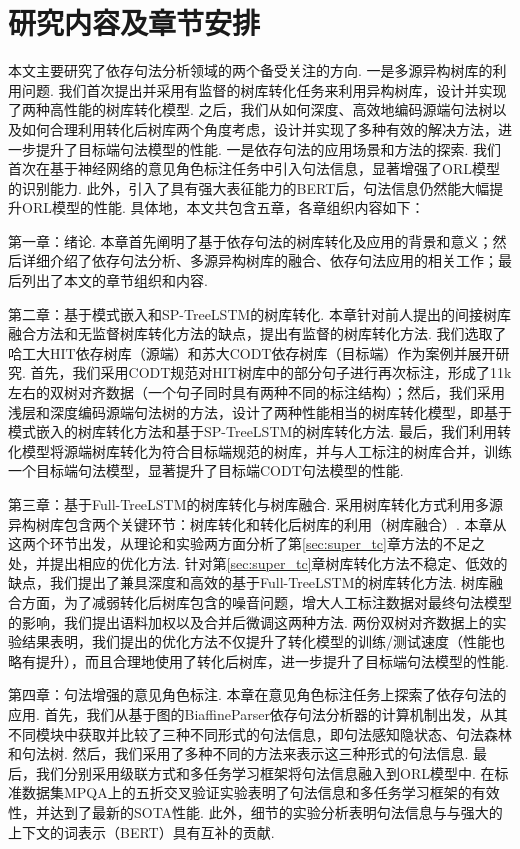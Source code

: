 \section{研究内容及章节安排}
本文主要研究了依存句法分析领域的两个备受关注的方向.
一是多源异构树库的利用问题. 我们首次提出并采用有监督的树库转化任务来利用异构树库，设计并实现了两种高性能的树库转化模型.
之后，我们从如何深度、高效地编码源端句法树以及如何合理利用转化后树库两个角度考虑，设计并实现了多种有效的解决方法，进一步提升了目标端句法模型的性能.
一是依存句法的应用场景和方法的探索.
我们首次在基于神经网络的意见角色标注任务中引入句法信息，显著增强了ORL模型的识别能力.
此外，引入了具有强大表征能力的BERT后，句法信息仍然能大幅提升ORL模型的性能.
具体地，本文共包含五章，各章组织内容如下：

第一章：绪论. 本章首先阐明了基于依存句法的树库转化及应用的背景和意义；然后详细介绍了依存句法分析、多源异构树库的融合、依存句法应用的相关工作；最后列出了本文的章节组织和内容.

第二章：基于模式嵌入和SP-TreeLSTM的树库转化.
本章针对前人提出的间接树库融合方法和无监督树库转化方法的缺点，提出有监督的树库转化方法. 我们选取了哈工大HIT依存树库（源端）和苏大CODT依存树库（目标端）作为案例并展开研究. 首先，我们采用CODT规范对HIT树库中的部分句子进行再次标注，形成了11k左右的双树对齐数据（一个句子同时具有两种不同的标注结构）；然后，我们采用浅层和深度编码源端句法树的方法，设计了两种性能相当的树库转化模型，即基于模式嵌入的树库转化方法和基于SP-TreeLSTM的树库转化方法. 最后，我们利用转化模型将源端树库转化为符合目标端规范的树库，并与人工标注的树库合并，训练一个目标端句法模型，显著提升了目标端CODT句法模型的性能.

第三章：基于Full-TreeLSTM的树库转化与树库融合.
采用树库转化方式利用多源异构树库包含两个关键环节：树库转化和转化后树库的利用（树库融合）. 本章从这两个环节出发，从理论和实验两方面分析了第\ref{sec:super_tc}章方法的不足之处，并提出相应的优化方法. 针对第\ref{sec:super_tc}章树库转化方法不稳定、低效的缺点，我们提出了兼具深度和高效的基于Full-TreeLSTM的树库转化方法. 树库融合方面，为了减弱转化后树库包含的噪音问题，增大人工标注数据对最终句法模型的影响，我们提出语料加权以及合并后微调这两种方法. 两份双树对齐数据上的实验结果表明，我们提出的优化方法不仅提升了转化模型的训练/测试速度（性能也略有提升），而且合理地使用了转化后树库，进一步提升了目标端句法模型的性能.

第四章：句法增强的意见角色标注.
本章在意见角色标注任务上探索了依存句法的应用. 首先，我们从基于图的BiaffineParser依存句法分析器的计算机制出发，从其不同模块中获取并比较了三种不同形式的句法信息，即句法感知隐状态、句法森林和句法树.
然后，我们采用了多种不同的方法来表示这三种形式的句法信息. 最后，我们分别采用级联方式和多任务学习框架将句法信息融入到ORL模型中. 在标准数据集MPQA上的五折交叉验证实验表明了句法信息和多任务学习框架的有效性，并达到了最新的SOTA性能. 此外，细节的实验分析表明句法信息与与强大的上下文的词表示（BERT）具有互补的贡献.


